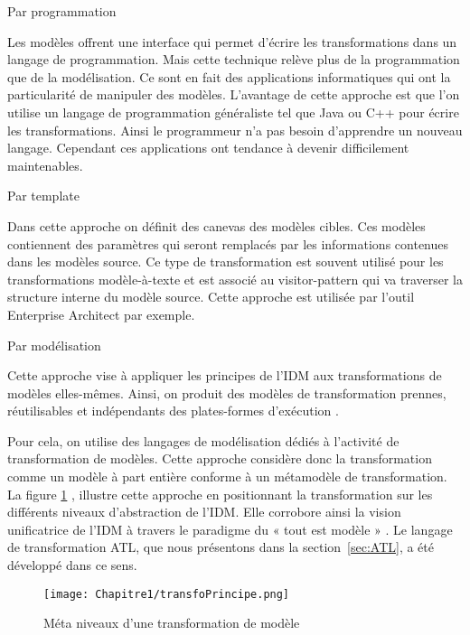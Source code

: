 \begin{bulletList}
\item Par programmation

Les modèles offrent une interface qui permet d'écrire les transformations dans 
un langage de programmation. Mais cette technique relève plus de la 
programmation que de la modélisation. Ce sont en fait des applications 
informatiques qui ont la particularité de manipuler des modèles. L'avantage de 
cette approche est que l'on utilise un langage de programmation généraliste tel 
que Java ou C++ pour écrire les transformations. Ainsi le programmeur n'a pas 
besoin d'apprendre un nouveau langage. Cependant ces applications ont tendance à 
devenir difficilement maintenables. 

\item Par template 

Dans cette approche on définit des canevas des modèles cibles. Ces modèles 
contiennent des paramètres qui seront remplacés par les informations contenues 
dans les modèles source. Ce type de transformation est souvent utilisé pour les 
transformations modèle-à-texte et est associé au visitor-pattern qui va 
traverser la structure interne du modèle source. Cette approche est utilisée par 
l'outil Enterprise Architect par exemple. 

\item Par modélisation

Cette approche vise à appliquer les principes de l'IDM aux transformations de 
modèles elles-mêmes. Ainsi, on produit des modèles de transformation prennes, 
réutilisables et indépendants des plates-formes d'exécution 
\cite{bezivin2006model}. 

Pour cela, on utilise des langages de modélisation dédiés à l'activité de 
transformation de modèles. Cette approche considère donc la transformation comme 
un modèle à part entière conforme à un métamodèle de transformation. La figure 
\ref{fig:TransfoPrincipe} , illustre cette approche en positionnant la 
transformation sur les différents niveaux d'abstraction de l'IDM. Elle corrobore 
ainsi la vision unificatrice de l'IDM à travers le paradigme du « tout est 
modèle » \cite{bezivin2005unification}. Le langage de transformation ATL, que 
nous présentons dans la section~\ref{sec:ATL}, a été développé dans ce sens. 

\end{bulletList}

\begin{figure}[!htbp]
 \begin{center}
  \texttt{[image: Chapitre1/transfoPrincipe.png]}
 \end{center}
 \caption{Méta niveaux d'une transformation de modèle}
 \label{fig:TransfoPrincipe}
\end{figure}

